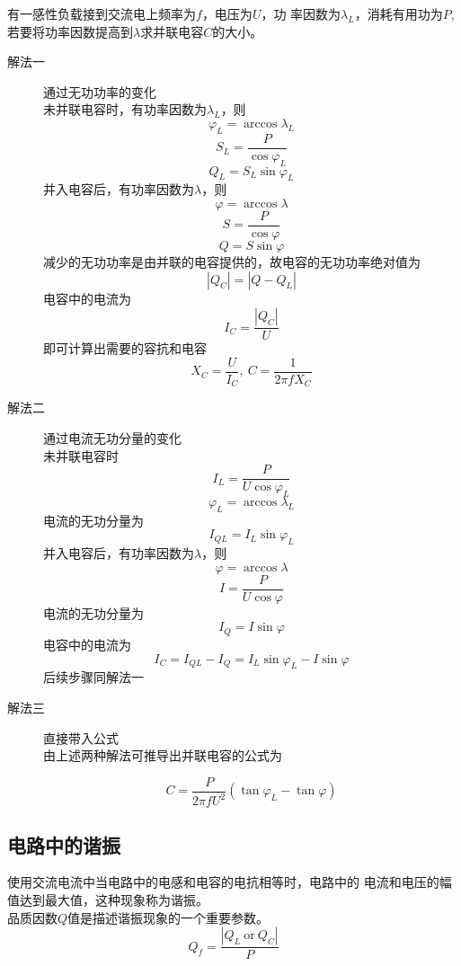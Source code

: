 \begin{example}
    有一感性负载接到交流电上频率为$f$，电压为$U$，功
    率因数为$\lambda_L$，消耗有用功为$P$,若要将功率因数提高到$\lambda$求并联电容$C$的大小。
    \begin{description}
        \item[解法一] 通过无功功率的变化\\
        未并联电容时，有功率因数为$\lambda_L$，则
        \[
            \varphi_L =\arccos \lambda_L
        \]
        \[
        S_L = \frac{P}{\cos \varphi_L}    
        \]
        \[
            Q_L = S_L\sin \varphi_L
        \]
        并入电容后，有功率因数为$\lambda$，则
        \[
            \varphi = \arccos \lambda
        \]
        \[
            S = \frac{P}{\cos \varphi}
        \]
        \[
            Q = S\sin \varphi
        \]
        减少的无功功率是由并联的电容提供的，故电容的无功功率绝对值为
        \[
            \left\lvert Q_C\right\rvert = \left\lvert Q - Q_L \right\rvert
        \]
        电容中的电流为
        \[
            I_C = \frac{\left\lvert Q_C\right\rvert}{U}
        \]
        即可计算出需要的容抗和电容
        \[
            X_C = \frac{U}{I_C},~ C = \frac{1}{2\pi f X_C}  
        \]            
        \item[解法二] 通过电流无功分量的变化\\
        未并联电容时
        \[
            I_L = \frac{P}{U\cos \varphi _L}
        \]
        \[
            \varphi_L = \arccos \lambda_L
        \]
        电流的无功分量为
        \[
            I_{QL} = I_L \sin \varphi_L
        \]
        并入电容后，有功率因数为$\lambda$，则
        \[
            \varphi = \arccos \lambda
        \]
        \[
            I = \frac{P}{U\cos \varphi}
        \]
        电流的无功分量为
        \[
            I_Q = I \sin \varphi
        \]
        电容中的电流为
        \[
            I_C = I_{QL}-I_Q =I_{L}\sin \varphi_L - I \sin \varphi
        \]
        后续步骤同解法一
        \item[解法三]直接带入公式\\
        由上述两种解法可推导出并联电容的公式为

        \[
            C = \frac{P}{2\pi f U^2}(\tan \varphi_L - \tan \varphi)  
        \]
        
    \end{description}
\end{example}

\subsection{电路中的谐振}
使用交流电流中当电路中的电感和电容的电抗相等时，电路中的
电流和电压的幅值达到最大值，这种现象称为谐振。\\
品质因数$Q$值是描述谐振现象的一个重要参数。
\[
    Q_f = \frac{\left\lvert Q_L ~ \text{or} ~ Q_C\right\rvert }{P}
\]

